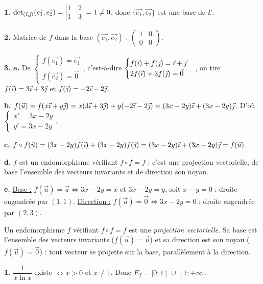 \documentclass[11pt]{article}
\begin{document}
\textbf{1.} $\det_{(\vec{\imath},\vec{\jmath})}(\vec{e_1}, \vec{e_2}) = \begin{vmatrix} 1 & 2 \\ 1 & 3 \end{vmatrix} = 1 \ne 0$, donc $\{\vec{e_1}, \vec{e_2}\}$ est une base de $\mathscr{E}$.

\textbf{2.} Matrice de $f$ dans la base $(\vec{e_1}, \vec{e_2})$ : $\begin{pmatrix} 1 & 0 \\ 0 & 0 \end{pmatrix}$.

\textbf{3. a.} De $\begin{cases} f(\vec{e_1}) = \vec{e_1} \\ f(\vec{e_2}) = \vec{0} \end{cases}$, c'est-à-dire $\begin{cases} f(\vec{\imath}) + f(\vec{\jmath}) = \vec{\imath} + \vec{\jmath} \\ 2f(\vec{\imath}) + 3f(\vec{\jmath}) = \vec{0} \end{cases}$, on tire $f(\vec{\imath}) = 3\vec{\imath} + 3\vec{\jmath}$ et $f(\vec{\jmath}) = -2\vec{\imath} - 2\vec{\jmath}$.

\textbf{b.} $f(\vec{u}) = f(x\vec{\imath} + y\vec{\jmath}) = x(3\vec{\imath} + 3\vec{\jmath}) + y(-2\vec{\imath} - 2\vec{\jmath}) = (3x - 2y)\vec{\imath} + (3x - 2y)\vec{\jmath}$. D'où $\begin{cases} x' = 3x - 2y \\ y' = 3x - 2y \end{cases}$.

\textbf{c.} $f\circ f(\vec{u}) = (3x - 2y)f(\vec{\imath}) + (3x - 2y)f(\vec{\jmath}) = (3x - 2y)\vec{\imath} + (3x - 2y)\vec{\jmath} = f(\vec{u})$.

\textbf{d.} $f$ est un endomorphisme vérifiant $f \circ f = f$ : c'est une projection vectorielle, de base l'ensemble des vecteurs invariants et de direction son noyau.

\textbf{e.} \underline{Base :} $f(\vec{u}) = \vec{u} \Leftrightarrow 3x - 2y = x$ et $3x - 2y = y$, soit $x - y = 0$ : droite engendrée par $(1, 1)$. \underline{Direction :} $f(\vec{u}) = \vec{0} \Leftrightarrow 3x - 2y = 0$ : droite engendrée par $(2, 3)$.

\begin{rappel}
Un endomorphisme $f$ vérifiant $f \circ f = f$ est une \emph{projection
vectorielle}. Sa base est l'ensemble des vecteurs invariants
($f(\vec{u}) = \vec{u}$) et sa direction est son noyau
($f(\vec{u}) = \vec{0}$) : tout vecteur se projette sur la base,
parallèlement à la direction.
\end{rappel}

\textbf{1.} $\dfrac{1}{x\ln x}$ existe $\Leftrightarrow x > 0$ et $x \ne 1$. Donc $E_f = ]0;1[\,\cup\,]1;+\infty[$.
\end{document}
